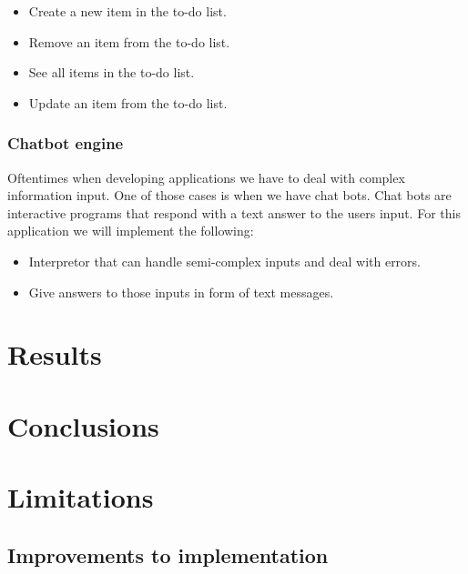 \documentclass[12pt]{article}
\begin{document}
\begin{itemize}
    \item Create a new item in the to-do list.
    \item Remove an item from the to-do list.
    \item See all items in the to-do list.
    \item Update an item from the to-do list.
\end{itemize}

\subsubsection{Chatbot engine}

Oftentimes when developing applications we have to deal with complex information
input. One of those cases is when we have chat bots. Chat bots are interactive
programs that respond with a text answer to the users input. For this
application we will implement the following:

\begin{itemize}
    \item Interpretor that can handle semi-complex inputs and deal with errors.
    \item Give answers to those inputs in form of text messages.
\end{itemize}    

\section{Results}\label{results}

\section{Conclusions}\label{conclusions}

\section{Limitations}\label{limitations}

\subsection{Improvements to implementation}



\end{document}
